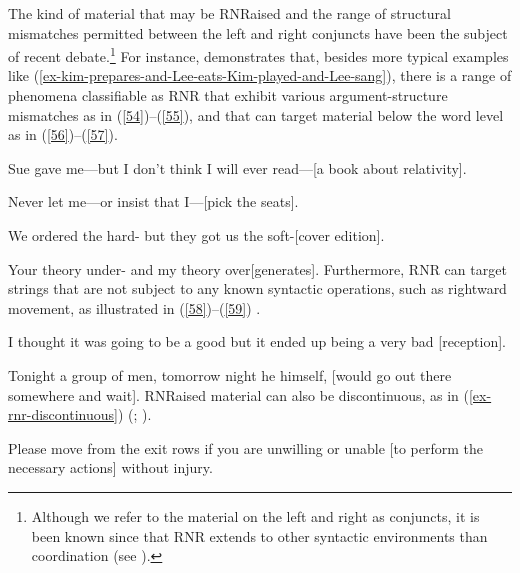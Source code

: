 %

The kind of material that may be RNRaised and the range of structural mismatches permitted between the left and right conjuncts have been the subject of recent debate.\footnote{Although we refer to the material on the left and right as conjuncts, it is been known since \citet{Hudson1976, Hudson1989} that RNR extends to other syntactic environments than coordination (see \citealt{Chaves2014}).} For instance, \citet[839--840]{Chaves2014} demonstrates that, besides more typical examples like (\ref{ex-kim-prepares-and-Lee-eats-Kim-played-and-Lee-sang}),
 there is a range of phenomena classifiable as RNR that exhibit various argument-structure mismatches as in (\ref{54})--(\ref{55}), and that can target material below the word level as in (\ref{56})--(\ref{57}).
%

\eal
\ex Sue gave me---but I don't think I will ever read---[a book about relativity]. \label{54}

\ex Never let me---or insist that I---[pick the seats].\label{55}

\ex We ordered the hard- but they got us the soft-[cover edition].\label{56}

\ex Your theory under- and my theory over[generates].\label{57}\zl
%
Furthermore, RNR can target strings that are not subject to any known syntactic operations, such as rightward movement, as illustrated in (\ref{58})--(\ref{59}) \citep[865]{Chaves2014}.

\eal
\ex I thought it was going to be a good but it ended up being a very bad [reception].\label{58}

\ex Tonight a group of men, tomorrow night he himself, [would go out there somewhere and wait].\label{59}\zl
RNRaised material can also be discontinuous, as in (\ref{ex-rnr-discontinuous}) (\citealt[868]{Chaves2014}; \citealt[238--240]{Whitman2009}).

\eal
\label{ex-rnr-discontinuous}
\ex Please move from the exit rows if you are unwilling or unable [to perform the necessary actions] without injury.\label{61}

